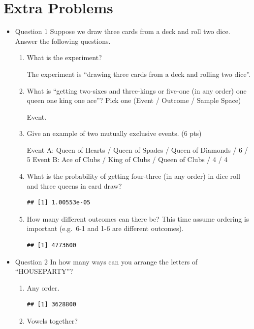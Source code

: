 \documentclass[]{book}
\theoremstyle{definition}
\theoremstyle{definition}
\theoremstyle{definition}
\theoremstyle{remark}
\begin{document}
\hypertarget{extra-problems}{%
\section{Extra Problems}\label{extra-problems}}

\begin{itemize}
\item
  Question 1 Suppose we draw three cards from a deck and roll two dice.
  Answer the following questions.

  \begin{enumerate}
  \def\labelenumi{\alph{enumi})}
  \item
    What is the experiment?

    The experiment is ``drawing three cards from a deck and rolling two
    dice''.
  \item
    What is ``getting two-sixes and three-kings or five-one (in any
    order) one queen one king one ace''? Pick one (Event / Outcome /
    Sample Space)

    Event.
  \item
    Give an example of two mutually exclusive events. (6 pts)

    Event A: Queen of Hearts / Queen of Spades / Queen of Diamonds / 6 /
    5 Event B: Ace of Clubs / King of Clubs / Queen of Clubs / 4 / 4
  \item
    What is the probability of getting four-three (in any order) in dice
    roll and three queens in card draw?

\begin{verbatim}
## [1] 1.00553e-05
\end{verbatim}
  \item
    How many different outcomes can there be? This time assume ordering
    is important (e.g.~6-1 and 1-6 are different outcomes).

\begin{verbatim}
## [1] 4773600
\end{verbatim}
  \end{enumerate}
\item
  Question 2 In how many ways can you arrange the letters of
  ``HOUSEPARTY''?

  \begin{enumerate}
  \def\labelenumi{\alph{enumi})}
  \item
    Any order.

\begin{verbatim}
## [1] 3628800
\end{verbatim}
  \item
    Vowels together?


\end{enumerate}
\end{itemize}
\end{document}
